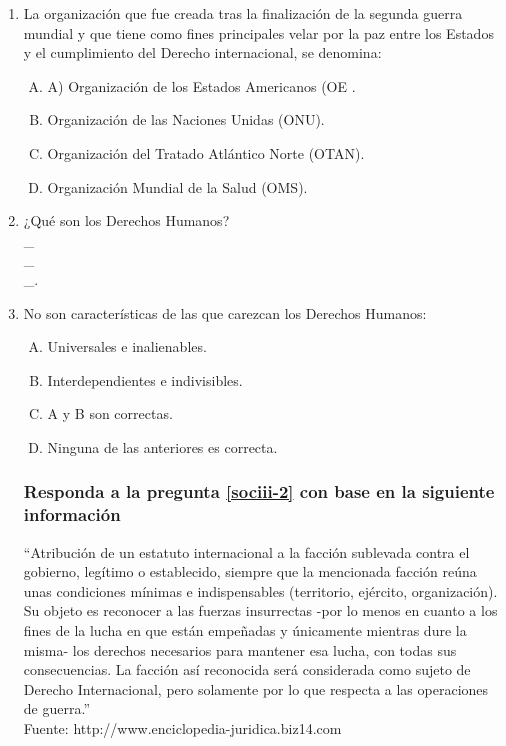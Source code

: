\begin{enumerate}

\item La organización que fue creada tras la finalización de la segunda guerra mundial y que tiene como fines principales velar por la paz entre los Estados y el cumplimiento del Derecho internacional, se denomina:\label{sociii-1}


\begin{enumerate}[(A)]
\item A) Organización de los Estados Americanos (OE .
 \item  Organización de las Naciones Unidas (ONU).
\item Organización del Tratado Atlántico Norte (OTAN).
\item Organización Mundial de la Salud (OMS).
\end{enumerate}


\item ¿Qué son los Derechos Humanos?\label{sociii-3}
\hrulefill\\
\_\hrulefill\\
\_\hrulefill\\
\_\hrulefill.


\item No son características de las que carezcan los Derechos Humanos:\label{sociii-4}


\begin{enumerate}[(A)]
\item   Universales e inalienables.
 \item  Interdependientes e indivisibles.
\item A y B son correctas.
\item Ninguna de las anteriores es correcta.
\end{enumerate}



\newpage
\subsubsection*{Responda a la pregunta \ref{sociii-2} con base en la siguiente información}

``Atribución de un estatuto internacional a la facción sublevada contra el gobierno, legítimo o establecido, siempre que la mencionada facción reúna unas condiciones mínimas e indispensables (territorio, ejército, organización). Su objeto es reconocer a las fuerzas insurrectas -por lo menos en cuanto a los fines de la lucha en que están empeñadas y únicamente mientras dure la misma- los derechos necesarios para mantener esa lucha, con todas sus consecuencias. La facción así reconocida será considerada como sujeto de Derecho Internacional, pero solamente por lo que respecta a las operaciones de guerra.''
\\{\footnotesize Fuente: http://www.enciclopedia-juridica.biz14.com}



\end{enumerate}
